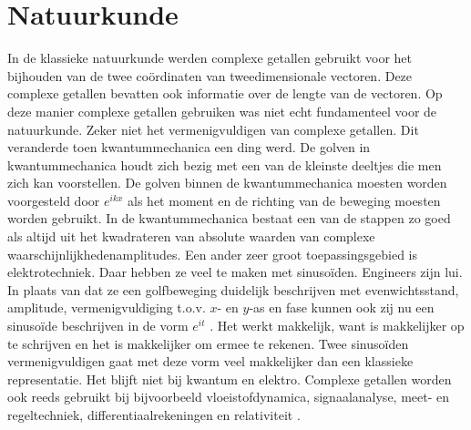 \documentclass[11pt,fleqn]{book} %
\begin{document}
\section{Natuurkunde}
In de klassieke natuurkunde werden complexe getallen gebruikt voor het bijhouden van de twee coördinaten van tweedimensionale vectoren. Deze complexe getallen bevatten ook informatie over de lengte van de vectoren. Op deze manier complexe getallen gebruiken was niet echt fundamenteel voor de natuurkunde. Zeker niet het vermenigvuldigen van complexe getallen.
Dit veranderde toen kwantummechanica een ding werd. De golven in kwantummechanica houdt zich bezig met een van de kleinste deeltjes die men zich kan voorstellen. De golven binnen de kwantummechanica moesten worden voorgesteld door $e^{ikx}$ \cite{motl} als het moment en de richting van de beweging moesten worden gebruikt. In de kwantummechanica bestaat een van de stappen zo goed als altijd uit het kwadrateren van absolute waarden van complexe waarschijnlijkhedenamplitudes.
Een ander zeer groot toepassingsgebied is elektrotechniek. Daar hebben ze veel te maken met sinusoïden. Engineers zijn lui. In plaats van dat ze een golfbeweging duidelijk beschrijven met evenwichtsstand, amplitude, vermenigvuldiging t.o.v. $x$- en $y$-as en fase kunnen ook zij nu een sinusoïde beschrijven in de vorm $e^{it}$ \cite{harish}. Het werkt makkelijk, want is makkelijker op te schrijven en het is makkelijker om ermee te rekenen. Twee sinusoïden vermenigvuldigen gaat met deze vorm veel makkelijker dan een klassieke representatie.
Het blijft niet bij kwantum en elektro. Complexe getallen worden ook reeds gebruikt bij bijvoorbeeld vloeistofdynamica, signaalanalyse, meet- en regeltechniek, differentiaalrekeningen en relativiteit \cite{complex_numbers}.
\end{document}
